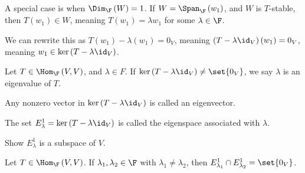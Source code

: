 \documentclass[10pt]{mypackage}
\begin{document}
A special case is when $\Dim_{\F}\left(W\right) = 1$. If $W = \Span_{\F}\left(w_1\right)$, and $W$ is $T$-stable, then $T\left(w_1\right) \in W$, meaning $T\left(w_1\right) = \lambda w_1$ for some $\lambda \in \F$.\newline

We can rewrite this as $T\left(w_1\right) - \lambda\left(w_1\right) = 0_V$, meaning $\left(T - \lambda \id_V\right)\left(w_1\right) = 0_V$, meaning $w_1\in \ker\left(T - \lambda\id_V\right)$.
\begin{definition}
  Let $T\in \Hom_{\F}\left(V,V\right)$, and $\lambda \in F$. If $\ker\left(T - \lambda\id_V\right) \neq \set{0_V}$, we say $\lambda$ is an eigenvalue of $T$.\newline

  Any nonzero vector in $\ker\left(T - \lambda \id_V\right)$ is called an eigenvector.\newline

  The set $E^{1}_{\lambda} = \ker\left(T - \lambda \id_V\right)$ is called the eigenspace associated with $\lambda$.
\end{definition}
\begin{exercise}
  Show $E^{1}_{\lambda}$ is a subspace of $V$.
\end{exercise}
\begin{exercise}
  Let $T\in \Hom_{\F}\left(V,V\right)$. If $\lambda_1,\lambda_2 \in \F$ with $\lambda_1\neq \lambda_2$, then $E^{1}_{\lambda_1} \cap E^{1}_{\lambda_2} = \set{0_V}$.
\end{exercise}
\end{document}
